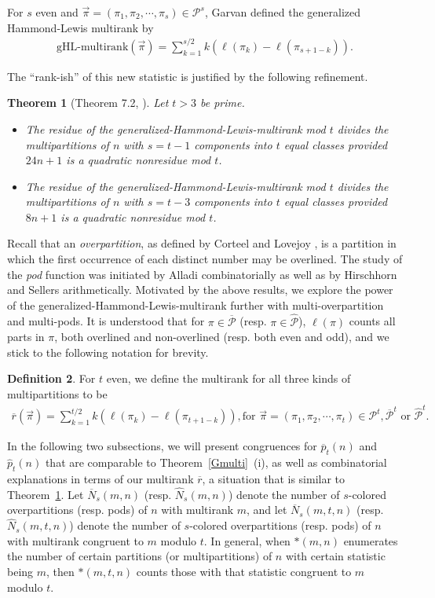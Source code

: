 \documentclass[12pt]{amsart}
\numberwithin{equation}{section}
\theoremstyle{plain}
\newtheorem{theorem}{Theorem}[section]
\theoremstyle{definition}
\newtheorem{Def}[theorem]{Definition}
\begin{document}
For $s$ even and $\overrightarrow{\pi}=(\pi_{1},\pi_{2},\cdots,\pi_{s})\in\mathcal{P}^{s}$, Garvan defined the generalized Hammond-Lewis multirank by
\begin{align*}
\textrm{gHL-multirank}(\overrightarrow{\pi})=\sum_{k=1}^{s/2}k(\ell(\pi_{k})-\ell(\pi_{s+1-k})).
\end{align*}

The ``rank-ish'' of this new statistic is justified by the following refinement.
\begin{theorem}[Theorem 7.2, \cite{Gar2}]\label{Gmultir}
Let $t>3$ be prime.
\begin{itemize}
\item[(i)] The residue of the generalized-Hammond-Lewis-multirank mod $t$ divides the multipartitions of $n$ with $s=t-1$ components into $t$ equal classes provided $24n+1$ is a quadratic nonresidue mod $t$.
\item[(ii)] The residue of the generalized-Hammond-Lewis-multirank mod $t$ divides the multipartitions of $n$ with $s=t-3$ components into $t$ equal classes provided
$8n+1$ is a quadratic nonresidue mod $t$.
\end{itemize}
\end{theorem}
Recall that an \emph{overpartition}, as defined by Corteel and Lovejoy \cite{CLo}, is a partition in which the first occurrence of each distinct number may be overlined. The study of the \emph{pod} function was initiated by Alladi \cite{All,All2} combinatorially as well as by Hirschhorn and Sellers \cite{HS} arithmetically.
Motivated by the above results, we explore the power of the generalized-Hammond-Lewis-multirank further with multi-overpartition and multi-pods. It is understood that for $\pi\in\mathcal{\overline{P}}$ (resp. $\pi\in\mathcal{\hat{P}}$), $\ell(\pi)$ counts all parts in $\pi$, both overlined and non-overlined (resp. both even and odd), and we stick to the following notation for brevity.
\begin{Def}
For $t$ even, we define the multirank for all three kinds of multipartitions to be
\begin{align}\label{multirank}
\overline{r}(\overrightarrow{\pi})=\sum_{k=1}^{t/2}k(\ell(\pi_{k})-\ell(\pi_{t+1-k})),\text{
 for }
\overrightarrow{\pi}=(\pi_{1},\pi_{2},\cdots,\pi_{t})\in\mathcal{P}^t, \mathcal{\overline{P}}^t \text{ or }\mathcal{\hat{P}}^t.
\end{align}
\end{Def}

In the following two subsections, we will present congruences for $\overline{p}_{t}(n)$ and $\hat{p}_t(n)$ that are comparable to Theorem~\ref{Gmulti}~(i), as well as combinatorial explanations in terms of our multirank $\overline{r}$, a situation that is similar to Theorem~\ref{Gmultir}. Let $\overline{N}_s(m,n)$ (resp. $\hat{N}_s(m,n)$) denote the number of $s$-colored overpartitions (resp. pods) of $n$ with multirank $m$, and let $\overline{N}_s(m,t,n)$ (resp. $\hat{N}_s(m,t,n)$) denote the number of $s$-colored overpartitions (resp. pods) of $n$ with multirank congruent to $m$ modulo $t$. In general, when $*(m,n)$ enumerates the number of certain partitions (or multipartitions) of $n$ with certain statistic being $m$, then $*(m,t,n)$ counts those with that statistic  congruent to $m$ modulo $t$.
\end{document}
